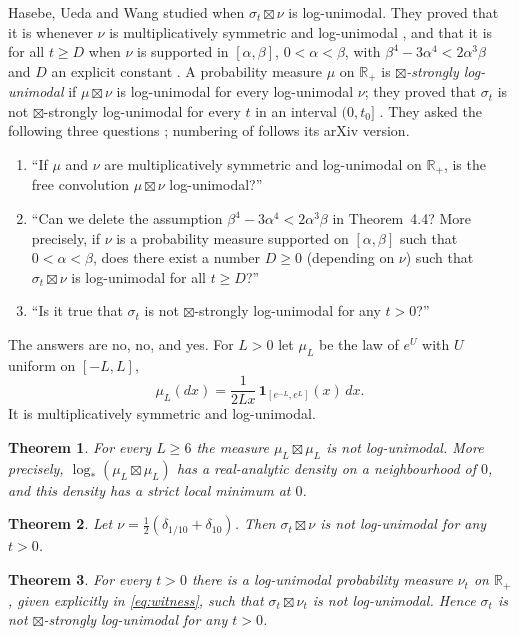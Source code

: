 \documentclass[11pt]{amsart}
\newtheorem{mainthm}{Theorem}
\theoremstyle{remark}
\newcommand{\R}{\mathbb R}
\newcommand{\Rp}{\R_{+}}
\begin{document}
Hasebe, Ueda and Wang \cite{HUW} studied when $\sigma_t\boxtimes\nu$ is log-unimodal. They proved that it is whenever $\nu$ is multiplicatively symmetric and log-unimodal \cite[Theorem~4.2]{HUW}, and that it is for all $t\ge D$ when $\nu$ is supported in $[\alpha,\beta]$, $0<\alpha<\beta$, with $\beta^4-3\alpha^4<2\alpha^3\beta$ and $D$ an explicit constant \cite[Theorem~4.4]{HUW}. A probability measure $\mu$ on $\Rp$ is \emph{$\boxtimes$-strongly log-unimodal} if $\mu\boxtimes\nu$ is log-unimodal for every log-unimodal $\nu$; they proved that $\sigma_t$ is not $\boxtimes$-strongly log-unimodal for every $t$ in an interval $(0,t_0]$ \cite[Theorem~4.9]{HUW}. They asked the following three questions \cite[Problems~4.3, 4.7 and~4.11]{HUW}; numbering of \cite{HUW} follows its arXiv version.
\begin{enumerate}[label=\textup{(\arabic*)}]
\item ``If $\mu$ and $\nu$ are multiplicatively symmetric and log-unimodal on $\Rp$, is the free convolution $\mu\boxtimes\nu$ log-unimodal?''
\item ``Can we delete the assumption $\beta^4-3\alpha^4<2\alpha^3\beta$ in Theorem~4.4? More precisely, if $\nu$ is a probability measure supported on $[\alpha,\beta]$ such that $0<\alpha<\beta$, does there exist a number $D\ge0$ (depending on $\nu$) such that $\sigma_t\boxtimes\nu$ is log-unimodal for all $t\ge D$?''
\item ``Is it true that $\sigma_t$ is not $\boxtimes$-strongly log-unimodal for any $t>0$?''
\end{enumerate}
The answers are no, no, and yes. For $L>0$ let $\mu_L$ be the law of $e^U$ with $U$ uniform on $[-L,L]$,
\[
\mu_L(dx)=\frac{1}{2Lx}\,\mathbf 1_{[e^{-L},e^{L}]}(x)\,dx .
\]
It is multiplicatively symmetric and log-unimodal.

\begin{mainthm}\label{thm:A}
For every $L\ge6$ the measure $\mu_L\boxtimes\mu_L$ is not log-unimodal. More precisely, $\log_*(\mu_L\boxtimes\mu_L)$ has a real-analytic density on a neighbourhood of $0$, and this density has a strict local minimum at $0$.
\end{mainthm}

\begin{mainthm}\label{thm:B}
Let $\nu=\frac12(\delta_{1/10}+\delta_{10})$. Then $\sigma_t\boxtimes\nu$ is not log-unimodal for any $t>0$.
\end{mainthm}

\begin{mainthm}\label{thm:C}
For every $t>0$ there is a log-unimodal probability measure $\nu_t$ on $\Rp$, given explicitly in \eqref{eq:witness}, such that $\sigma_t\boxtimes\nu_t$ is not log-unimodal. Hence $\sigma_t$ is not $\boxtimes$-strongly log-unimodal for any $t>0$.
\end{mainthm}
\end{document}
